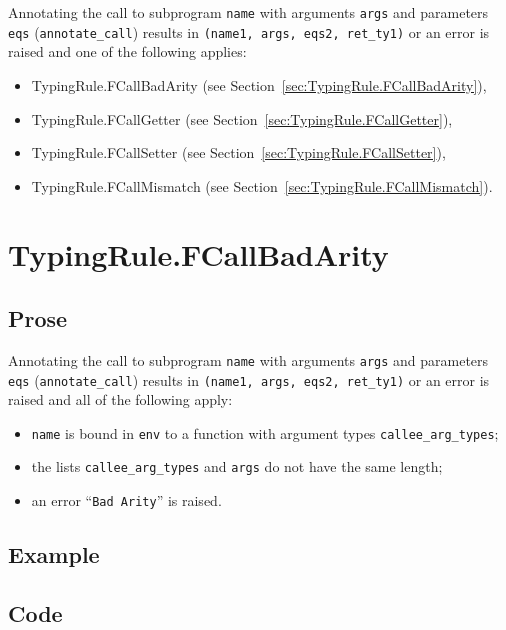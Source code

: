 \documentclass{book}
\begin{document}
Annotating the call to subprogram \texttt{name} with arguments \texttt{args} and
parameters \texttt{eqs} (\texttt{annotate\_call}) results in \texttt{(name1,
args, eqs2, ret\_ty1)} or an error is raised and one of the following applies:
\begin{itemize}
\item TypingRule.FCallBadArity (see Section~\ref{sec:TypingRule.FCallBadArity}),
\item TypingRule.FCallGetter (see Section~\ref{sec:TypingRule.FCallGetter}),
\item TypingRule.FCallSetter (see Section~\ref{sec:TypingRule.FCallSetter}),
\item TypingRule.FCallMismatch (see Section~\ref{sec:TypingRule.FCallMismatch}).
\end{itemize}

\section{TypingRule.FCallBadArity \label{sec:TypingRule.FCallBadArity}}

  \subsection{Prose} 
  Annotating the call to subprogram \texttt{name} with arguments \texttt{args}
and parameters \texttt{eqs} (\texttt{annotate\_call}) results in
\texttt{(name1, args, eqs2, ret\_ty1)} or an error is raised and all of the
following apply:
   \begin{itemize}
   \item \texttt{name} is bound in \texttt{env} to a function with argument types \texttt{callee\_arg\_types};
   \item the lists \texttt{callee\_arg\_types} and \texttt{args} do not have the same length;
   \item an error ``\texttt{Bad Arity}'' is raised.
   \end{itemize}

  \subsection{Example}

  \subsection{Code}
\end{document}
